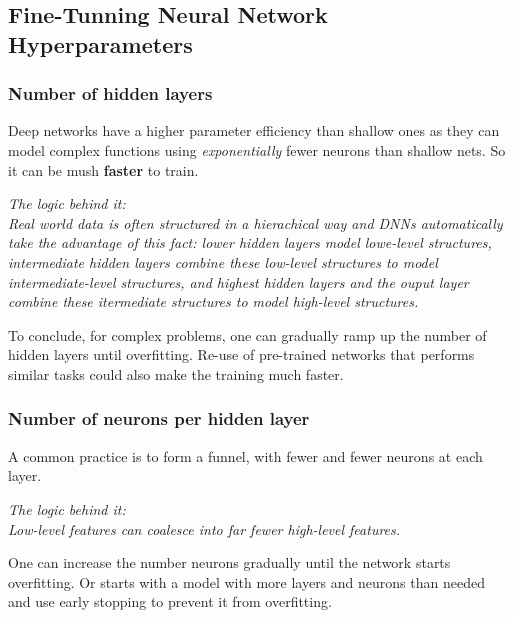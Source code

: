 \documentclass[12pt,oneside,a4paper]{article}
\numberwithin{equation}{section}
\begin{document}
\subsection{Fine-Tunning Neural Network Hyperparameters}
\subsubsection{Number of hidden layers}
Deep networks have a higher parameter efficiency than shallow ones as they can model complex functions using \emph{exponentially} fewer neurons than shallow nets. So it can be mush \textbf{faster} to train.

\textit{The logic behind it: \\ Real world data is often structured in a hierachical way and DNNs automatically take the advantage of this fact: lower hidden layers model lowe-level structures, intermediate hidden layers combine these low-level structures to model intermediate-level structures, and highest hidden layers and the ouput layer combine these itermediate structures to model high-level structures.}

To conclude, for complex problems, one can gradually ramp up the number of hidden layers until overfitting. Re-use of pre-trained networks that performs similar tasks could also make the training much faster.

\subsubsection{Number of neurons per hidden layer}

A common practice is to form a funnel, with fewer and fewer neurons at each layer. 

\textit{The logic behind it: \\ Low-level features can coalesce into far fewer high-level features.}

One can increase the number neurons gradually until the network starts overfitting. Or starts with a model with more layers and neurons than needed and use early stopping to prevent it from overfitting.
\end{document}
